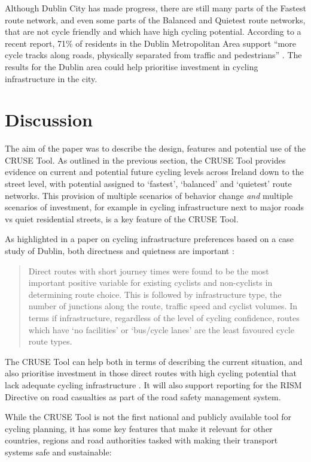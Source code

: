 \documentclass[
  super,
  preprint,
  3p]{elsarticle}
\begin{document}
Although Dublin City has made progress, there are still many parts of
the Fastest route network, and even some parts of the Balanced and
Quietest route networks, that are not cycle friendly and which have high
cycling potential. According to a recent report, 71\% of residents in
the Dublin Metropolitan Area support ``more cycle tracks along roads,
physically separated from traffic and pedestrians'' \citep{walking2021}.
The results for the Dublin area could help prioritise investment in
cycling infrastructure in the city.

\section{Discussion}\label{sec-discussion}

The aim of the paper was to describe the design, features and potential
use of the CRUSE Tool. As outlined in the previous section, the CRUSE
Tool provides evidence on current and potential future cycling levels
across Ireland down to the street level, with potential assigned to
`fastest', `balanced' and `quietest' route networks. This provision of
multiple scenarios of behavior change \emph{and} multiple scenarios of
investment, for example in cycling infrastructure next to major roads vs
quiet residential streets, is a key feature of the CRUSE Tool.

As highlighted in a paper on cycling infrastructure preferences based on
a case study of Dublin, both directness and quietness are important
\citep{caulfield2012}:

\begin{quote}
Direct routes with short journey times were found to be the most
important positive variable for existing cyclists and non-cyclists in
determining route choice. This is followed by infrastructure type, the
number of junctions along the route, traffic speed and cyclist volumes.
In terms if infrastructure, regardless of the level of cycling
confidence, routes which have `no facilities' or `bus/cycle lanes' are
the least favoured cycle route types.
\end{quote}

The CRUSE Tool can help both in terms of describing the current
situation, and also prioritise investment in those direct routes with
high cycling potential that lack adequate cycling infrastructure
\citep{caulfield2012}. It will also support reporting for the RISM
Directive on road casualties as part of the road safety management
system.

While the CRUSE Tool is not the first national and publicly available
tool for cycling planning, it has some key features that make it
relevant for other countries, regions and road authorities tasked with
making their transport systems safe and sustainable:
\end{document}
